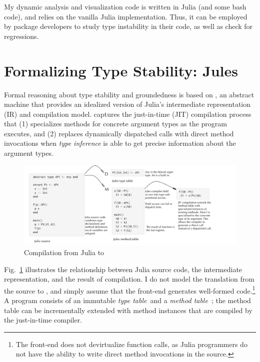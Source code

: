 \documentclass[oneside,openright,titlepage,numbers=noenddot,%
headinclude,footinclude,cleardoublepage=empty,abstract=on,
BCOR=5mm,paper=a4,fontsize=11pt,
dvipsnames
]{scrreprt}
\begin{document}
My dynamic analysis and visualization code is written in Julia (and some bash
code), and relies on the vanilla Julia implementation. Thus, it can be employed
by package developers to study type instability in their code, as well as check
for regressions.


\section{Formalizing Type Stability: Jules}%
\label{sec:jules}


Formal reasoning about type stability and groundedness is based on
\jules, an abstract machine that provides an idealized version of
Julia's intermediate representation (IR) and compilation model.
\jules captures the just-in-time (JIT) compilation process that (1) specializes methods
for concrete argument types as the program executes, and (2) replaces dynamically
dispatched calls with direct method invocations when \emph{type inference}
is able to get precise information about the argument types.

\begin{figure}[!h]
  \includegraphics[width=1.1\columnwidth]{figs/compile.pdf}
  \caption{Compilation from Julia to \jules}\label{comp}
\end{figure}

Fig.~\ref{comp} illustrates the relationship between Julia source code, the
\jules intermediate representation, and the result of compilation. I do not model
the translation from the source to \jules, and simply assume that the front-end
generates well-formed \jules code.\footnote{The front-end does not devirtualize
function calls, as Julia programmers do not have the ability to write direct
method invocations in the source.} A \jules program consists of an immutable \emph{type
table}~\tytbl and a \emph{method table}~\mtbl; the method table can be incrementally extended
with method instances that are compiled by the just-in-time compiler.
\end{document}
